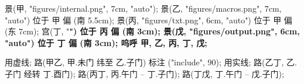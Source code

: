 \usemodule[zhfonts]

景(甲, "figures/internal.png", 7cm, "auto");
景(乙, "figures/macros.png", 7cm, "auto") 位于 甲 偏 (南 5.5cm);
景(丙, "figures/txt.png", 6cm, "auto") 位于 甲 偏 (东 7cm);
宫(丁, "\bf{}") 位于 丙 偏 (南 3cm);
景(戊, "figures/output.png", 6cm, "auto") 位于 丁 偏 (南 3cm);
呜呼 甲, 乙, 丙, 丁, 戊;

用虚线;
路(甲乙, 甲.未门 纬至 乙.子门) 标注 ("include", 90);
用实线;
路(乙丁, 乙.子门 经转 丁.酉门);
路(丙丁, 丙.午门 -- 丁.子门);
路(丁戊, 丁.午门 -- 戊.子门);
\stopuseMPgraphic
\startTEXpage[offset=4pt]
\stopTEXpage
